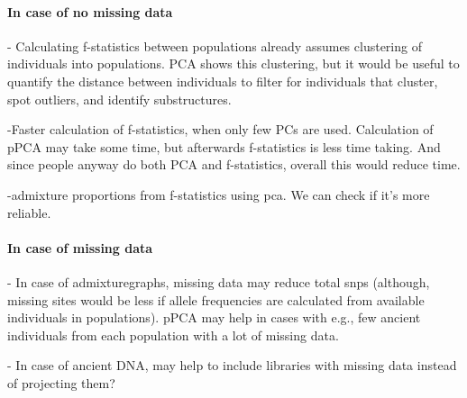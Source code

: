 \documentclass[12pt, letterpaper]{article}
\begin{document}
\paragraph{In case of no missing data}

- Calculating f-statistics between populations already assumes clustering of individuals into populations. PCA shows this clustering, but it would be useful to quantify the distance between individuals to filter for individuals that cluster, spot outliers, and identify substructures.

-Faster calculation of f-statistics, when only few PCs are used. Calculation of pPCA may take some time, but afterwards f-statistics is less time taking. And since people anyway do both PCA and f-statistics, overall this would reduce time.

-admixture proportions from f-statistics using pca. We can check if it's more reliable.
\paragraph{In case of missing data}

- In case of admixturegraphs, missing data may reduce total snps (although, missing sites would be less if allele frequencies are calculated from available individuals in populations). pPCA may help in cases with e.g., few ancient individuals from each population with a lot of missing data. 

- In case of ancient DNA, may help to include libraries with missing data instead of projecting them?
\newpage
\end{document}

